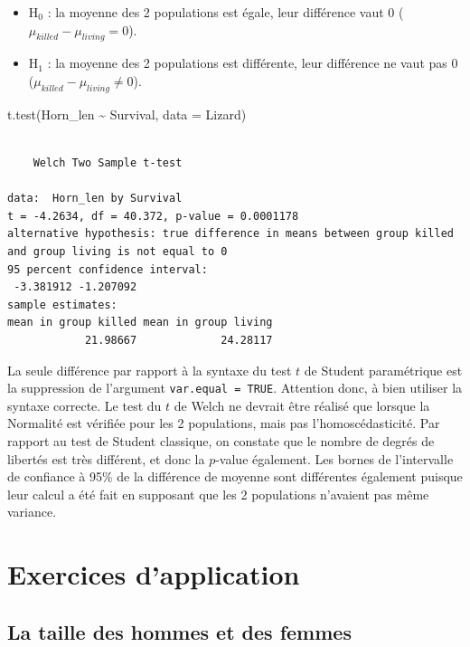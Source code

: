 \documentclass[
  a4paper,
  DIV=11,
  numbers=noendperiod,
  oneside]{scrreprt}
\newenvironment{Shaded}{}{}
\newcommand{\AttributeTok}[1]{\textcolor[rgb]{0.84,0.23,0.29}{#1}}
\newcommand{\FunctionTok}[1]{\textcolor[rgb]{0.44,0.26,0.76}{#1}}
\newcommand{\NormalTok}[1]{\textcolor[rgb]{0.14,0.16,0.18}{#1}}
\newcommand{\SpecialCharTok}[1]{\textcolor[rgb]{0.00,0.36,0.77}{#1}}
\providecommand{\tightlist}{%
  \setlength{\itemsep}{0pt}\setlength{\parskip}{0pt}}\usepackage{longtable,booktabs,array}
\begin{document}
\begin{itemize}
\tightlist
\item
  H\(_0\) : la moyenne des 2 populations est égale, leur différence vaut
  0 (\(\mu_{killed}-\mu_{living} = 0\)).
\item
  H\(_1\) : la moyenne des 2 populations est différente, leur différence
  ne vaut pas 0 (\(\mu_{killed}-\mu_{living} \neq 0\)).
\end{itemize}

\begin{Shaded}
\begin{Highlighting}[]
\FunctionTok{t.test}\NormalTok{(Horn\_len }\SpecialCharTok{\textasciitilde{}}\NormalTok{ Survival, }\AttributeTok{data =}\NormalTok{ Lizard)}
\end{Highlighting}
\end{Shaded}

\begin{verbatim}

    Welch Two Sample t-test

data:  Horn_len by Survival
t = -4.2634, df = 40.372, p-value = 0.0001178
alternative hypothesis: true difference in means between group killed and group living is not equal to 0
95 percent confidence interval:
 -3.381912 -1.207092
sample estimates:
mean in group killed mean in group living 
            21.98667             24.28117 
\end{verbatim}

La seule différence par rapport à la syntaxe du test \(t\) de Student
paramétrique est la suppression de l'argument
\texttt{var.equal\ =\ TRUE}. Attention donc, à bien utiliser la syntaxe
correcte. Le test du \(t\) de Welch ne devrait être réalisé que lorsque
la Normalité est vérifiée pour les 2 populations, mais pas
l'homoscédasticité. Par rapport au test de Student classique, on
constate que le nombre de degrés de libertés est très différent, et donc
la \(p\)-value également. Les bornes de l'intervalle de confiance à 95\%
de la différence de moyenne sont différentes également puisque leur
calcul a été fait en supposant que les 2 populations n'avaient pas même
variance.

\hypertarget{exercices-dapplication}{%
\section{Exercices d'application}\label{exercices-dapplication}}

\hypertarget{la-taille-des-hommes-et-des-femmes}{%
\subsection{La taille des hommes et des
femmes}\label{la-taille-des-hommes-et-des-femmes}}
\end{document}
